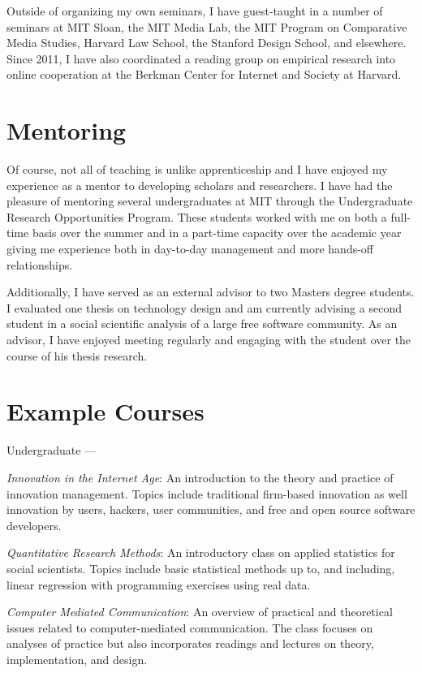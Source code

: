 \documentclass[10pt]{memoir}
\newenvironment{enumerate*}%
  {\begin{enumerate}%
    \setlength{\itemsep}{0pt}%
    \setlength{\parskip}{0pt}}%
  {\end{enumerate}}
\begin{document}
Outside of organizing my own seminars, I have guest-taught in a number
of seminars at MIT Sloan, the MIT Media Lab, the MIT Program on
Comparative Media Studies, Harvard Law School, the Stanford Design
School, and elsewhere. Since 2011, I have also coordinated a reading
group on empirical research into online cooperation at the Berkman
Center for Internet and Society at Harvard.

\section{Mentoring}

Of course, not all of teaching is unlike apprenticeship and I have
enjoyed my experience as a mentor to developing scholars and
researchers. I have had the pleasure of mentoring several
undergraduates at MIT through the Undergraduate Research Opportunities
Program. These students worked with me on both a full-time basis over
the summer and in a part-time capacity over the academic year giving
me experience both in day-to-day management and more hands-off
relationships.

Additionally, I have served as an external advisor to two Masters
degree students. I evaluated one thesis on technology design and am
currently advising a second student in a social scientific analysis of
a large free software community. As an advisor, I have enjoyed meeting
regularly and engaging with the student over the course of his thesis
research.

\section{Example Courses}

Undergraduate ---

\begin{enumerate*}
\item \emph{Innovation in the Internet Age}: An introduction to the
  theory and practice of innovation management. Topics include
  traditional firm-based innovation as well innovation by users,
  hackers, user communities, and free and open source software
  developers.
\item \emph{Quantitative Research Methods}: An introductory class on
  applied statistics for social scientists. Topics include basic
  statistical methods up to, and including, linear regression with
  programming exercises using real data.
\item \emph{Computer Mediated Communication}: An overview of practical
  and theoretical issues related to computer-mediated
  communication. The class focuses on analyses of practice but also
  incorporates readings and lectures on theory, implementation, and
  design.
\end{enumerate*}
\end{document}
